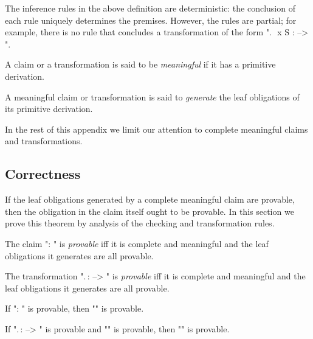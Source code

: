 \documentclass[a4paper]{easychair}
\begin{document}
\noindent The inference rules in the above definition are deterministic: the
conclusion of each rule uniquely determines the premises. However, the
rules are partial; for example, there is no rule that concludes a
transformation of the form "\sigma.\,\TAKE\ x \in S :  --> ".

\begin{defn} \label{defn:meaningful}
A claim or a transformation is said to be \emph{meaningful} if it
  has a primitive derivation.
\end{defn}

\begin{defn}
A meaningful claim or transformation is said to \emph{generate} the
  leaf obligations of its primitive derivation.
\end{defn}

\noindent In the rest of this appendix we limit our attention to complete
meaningful claims and transformations.

\subsection{Correctness}
\label{apx:correctness}

If the leaf obligations generated by a complete meaningful claim are
provable, then the obligation in the claim itself ought to be
provable. In this section we prove this theorem by analysis of the
checking and transformation rules.

\begin{defn}
\label{defn:proc-provable} \mbox{}
\begin{ecom}
  \item The claim "\pi : " is \emph{provable} iff it is
    complete and meaningful and the leaf obligations it generates are
    all provable.
  \item The transformation "\sigma.\,\tau :  --> " is \emph{provable} iff it is complete and meaningful and
    the leaf obligations it generates are all provable.
  \end{ecom}
\end{defn}

\begin{thm}[Correctness] \label{thm:correctness} \mbox{}
\begin{ecom}[\LSP (1)]
  \item If "\pi : " is provable, then ""
    is provable.
  \item If "\sigma.\,\tau :  --> " is
    provable and "" is provable, then "" is provable.
  \end{ecom}
\end{thm}
\end{document}
